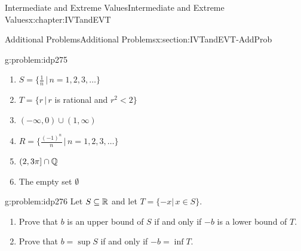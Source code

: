 \begin{chapterptx}{Intermediate and Extreme Values}{}{Intermediate and Extreme Values}{}{}{x:chapter:IVTandEVT}
\begin{sectionptx}{Additional Problems}{}{Additional Problems}{}{}{x:section:IVTandEVT-AddProb}
\begin{problem}{}{g:problem:idp275}
			\begin{enumerate}[label=(\alph*)]
				\item{}\(\displaystyle S=\{\frac{1}{n}\,|\,n=1,2,3,\ldots\}\)%
				\item{}\(T=\{r\,|\,r\) is rational and \(r^2\lt 2\}\)%
				\item{}\(\displaystyle (-\infty,0)\cup(1,\infty)\)%
				\item{}\(\displaystyle R=\{\frac{(-1)^n}{n}\,|\,n=1,2,3,\ldots\}\)%
				\item{}\(\displaystyle (2,3\pi]\cap\mathbb {Q}\)%
				\item{}The empty set \(\emptyset\)%
			\end{enumerate}
		\end{problem}
		\begin{problem}{}{g:problem:idp276}%
			 Let \(S\subseteq\mathbb {R}\) and let \(T=\{-x|\,x\in S\}\).%
			\begin{enumerate}[label=(\alph*)]
				\item{}Prove that \(b\) is an upper bound of \(S\) if and only if \(-b\) is a lower bound of \(T\).%
				\item{}Prove that \(b=\sup S\) if and only if \(-b=\inf T\).%
			\end{enumerate}
		\end{problem}
	\end{sectionptx}
\end{chapterptx}
%
%